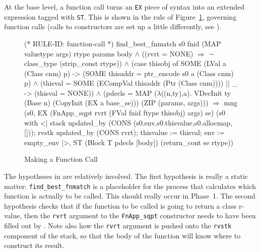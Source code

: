 \documentclass[11pt]{article}
\begin{document}
%
%
%
At the base level, a function call turns an \texttt{EX} piece of
syntax into an extended expression tagged with \texttt{ST}.  This is
shown in the rule  of
Figure~\ref{fig:function-call}, governing function calls (calls to
constructors are set up a little differently, see
).
\begin{figure}[hbtp]
\begin{stdrule}
(* RULE-ID: function-call *)
     find_best_fnmatch s0 fnid (MAP valuetype args) rtype
                       params body \(\land\)
     ((rvrt = NONE) \(\Rightarrow\) \(\neg\)class_type (strip_const rtype)) \(\land\)
     (case thisobj of
         SOME (LVal a (Class cnm) p) ->
            (SOME thisaddr = ptr_encode s0 a (Class cnm) p) \(\land\)
            (thisval = SOME (ECompVal thisaddr
                                      (Ptr (Class cnm))))
      || _ -> (thisval = NONE)) \(\land\)
     (pdecls = MAP (\(\lambda\)((n,ty),a).
                          VDecInit ty
                                   (Base n)
                                   (CopyInit (EX a base_se)))
                   (ZIP (params, args)))
   \(\Rightarrow\)
     mng (s0, EX (FnApp_sqpt rvrt
                             (FVal fnid ftype thisobj)
                             args)
                 se)
         (s0 with <|
            stack updated_by
                  (CONS (s0.env,s0.thisvalue,s0.allocmap,[]));
            rvstk updated_by (CONS rvrt);
            thisvalue := thisval;
            env := empty_env
          |>,
          ST (Block T pdecls [body]) (return_cont se rtype))
\end{stdrule}
\caption{Making a Function Call}
\label{fig:function-call}
\end{figure}
%

The hypotheses in  are relatively involved.  The
first hypothesis is really a static matter: \texttt{find_best_fnmatch}
is a placeholder for the process that calculates which function is
actually to be called.  This should really occur in Phase~1.  The
second hypothesis checks that if the function to be called is going to
return a class r-value, then the \texttt{rvrt} argument to the
\texttt{FnApp_sqpt} constructor needs to have been filled out by
.  Note also how the \texttt{rvrt} argument is
pushed onto the \texttt{rvstk} component of the stack, so that the
body of the function will know where to construct its result.
\end{document}
